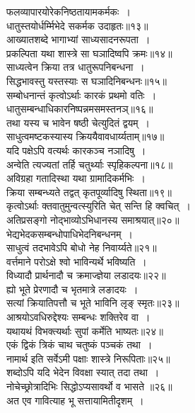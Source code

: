 {{{{\begin{center}
 फलव्यापारयोरेकनिष्ठतायामकर्मकः~।\\
 धातुस्तयोर्धर्म्मिभेदे सकर्मक उदाहृतः॥१३॥\\[10pt]
 आख्यातशब्दे भागाभ्यां साध्यसादनरूपता~।\\
 प्रकल्पिता यथा शास्त्रे सा घञादिष्वपि क्रमः॥१४॥\\[10pt]
 साध्यत्वेन क्रिया तत्र धातुरूपनिबन्धना~।\\
 सिद्धभावस्तु यस्तस्याः स घञादिनिबन्धनः॥१५॥\\[10pt]
 सम्बोधनान्तं कृत्वोऽर्थाः कारकं प्रथमो वतिः~।\\
 धातुसम्बन्धाधिकारनिष्पन्नमसमस्तनञ्॥१६॥\\[10pt]
 तथा यस्य च भावेन षष्ठी चेत्युदितं द्वयम्~।\\
 साधुत्वमष्टकस्यास्य क्रिययैवावधार्य्यताम्॥१७॥\\[10pt]
यदि पक्षेऽपि वत्यर्थः कारकञ्च नञादिषु~।\\
अन्वेति त्यज्यतां तर्हि चतुर्थ्याः स्पृहिकल्पना॥१८॥\\[10pt]
 अविग्रहा गतादिस्था यथा ग्रामादिकर्मभिः~।\\
 क्रिया सम्बन्ध्यते तद्वत् कृतपूर्व्यादिषु स्थिता॥१९॥\\[10pt]
 कृत्वोऽर्थाः क्तवातुमुन्वत्स्युरिति चेत् सन्ति हि क्वचित्~।\\
 अतिप्रसङ्गो नोद्भाव्योऽभिधानस्य समाश्रयात्॥२०॥\\[10pt]
 भेद्यभेदकसम्बन्धोपाधिभेदनिबन्धनम्~।\\
 साधुत्वं तदभावेऽपि बोधो नेह निवार्य्यते॥२१॥\\[10pt]
 वर्त्तमाने परोऽक्षे श्वो भाविन्यर्थे भविष्यति~।\\
 विध्यादौ प्रार्थनादौ च क्रमाज्ज्ञेया लडादयः॥२२॥\\[10pt]
 ह्यो भूते प्रेरणादौ च भृतमात्रे लङादयः~।\\
 सत्यां क्रियातिपत्तौ च भूते भाविनि लृङ् स्मृतः॥२३॥\\[10pt]
 आश्रयोऽवधिरुद्देश्यः सम्बन्धः शक्तिरेव वा~।\\
 यथायथं विभक्त्यर्थाः सुपां कर्मेति भाष्यतः॥२४॥\\[10pt]
 एकं द्विकं त्रिकं चाथ चतुष्कं पञ्चकं तथा~।\\
 नामार्थ इति सर्वेऽमी पक्षाः शास्त्रे निरूपिताः॥२५॥\\[10pt]
 शब्दोऽपि यदि भेदेन विवक्षा स्यात् तदा तथा~।\\
 नोचेच्छ्रोत्रादिभिः सिद्धोऽप्यसावर्थो व भासते ॥२६॥\\[10pt]
 अत एव गावित्याह भू सत्तायामितीदृशम्~।\\

\end{center}}}}}
